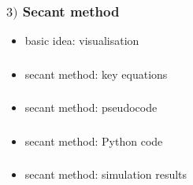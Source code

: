 \documentclass[english,14pt]{beamer}
\begin{document}

\begin{frame}[fragile]

\frametitle{$3)$ Secant method}

\begin{itemize}
	\item basic idea: visualisation
\end{itemize}

\end{frame}


\begin{frame}[fragile]

\frametitle{}

\begin{itemize}
	\item secant method: key equations
\end{itemize}

\end{frame}


\begin{frame}[fragile]

\frametitle{}

\begin{itemize}
	\item secant method: pseudocode
\end{itemize}

\end{frame}


\begin{frame}[fragile]

\frametitle{}

\begin{itemize}
	\item secant method: Python code
\end{itemize}

\end{frame}


\begin{frame}[fragile]

\frametitle{}

\begin{itemize}
	\item secant method: simulation results
\end{itemize}

\end{frame}
\end{document}
